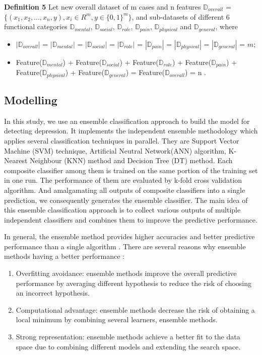\documentclass[10pt,journal,compsoc]{IEEEtran}
\begin{document}
\textbf{Definition 5} Let new overall dataset of m cases and n features $\mathbb{D}_{overall}$ = $\displaystyle \big\{ (x_{1}, x_{2}, ... , x_{n}, y ), x_{i} \in R^{m}, y \in {\{0, 1\}}^{m}  \big\}$, and sub-datasets of different 6 functional categories $\mathbb{D}_{mental}$, $\mathbb{D}_{social}$, $\mathbb{D}_{role}$, $\mathbb{D}_{pain}$, $\mathbb{D}_{physical}$ and $\mathbb{D}_{general}$, where
\begin{itemize}
  \item $|\mathbb{D}_{overall}|$ = $|\mathbb{D}_{mental}|$ = $|\mathbb{D}_{social}|$ = $|\mathbb{D}_{role}|$ = $|\mathbb{D}_{pain}|$ = $|\mathbb{D}_{physical}|$ = $|\mathbb{D}_{general}|$ = $m$;
  \item Feature($\mathbb{D}_{mental}$) + Feature($\mathbb{D}_{social}$) + Feature($\mathbb{D}_{role}$) + Feature($\mathbb{D}_{pain}$) + Feature($\mathbb{D}_{physical}$) + Feature($\mathbb{D}_{general}$) = Feature($\mathbb{D}_{overall}$) = n . \\
\end{itemize}

\subsection{Modelling}
In this study, we use an ensemble classification approach to build the model for detecting depression. It implements the independent ensemble methodology which applies several classification techniques in parallel. They are Support Vector Machine (SVM) technique, Artificial Neutral Network(ANN) algorithm, K-Nearest Neighbour (KNN) method and Decision Tree (DT) method. Each composite classifier among them is trained on the same portion of the training set in one run. The performance of them are evaluated by k-fold cross validation algorithm. And amalgamating all outputs of composite classifiers into a single prediction, we consequently generates the ensemble classifier. The main idea of this ensemble classification approach is to collect various outputs of multiple independent classifiers and combines them to improve the predictive performance. 

In general, the ensemble method provides higher accuracies and better predictive performance than a single algorithm \cite{Rokach}. There are several reasons why ensemble methods having a better performance \cite{Sagi}: 
\renewcommand\labelitemii{$\square$}
\begin{enumerate}[label=(\roman*)]
  \item Overfitting avoidance: ensemble methods improve the overall predictive performance by averaging different hypothesis to reduce the risk of choosing an incorrect hypothesis.  
  \item \vspace{3mm} Computational advantage: ensemble methods decrease the risk of obtaining a local minimum by combining several learners, ensemble methods.
  \item \vspace{3mm}Strong representation: ensemble methods achieve a better fit to the data space due to combining different models and extending the search space. 
\end{enumerate}
\end{document}

